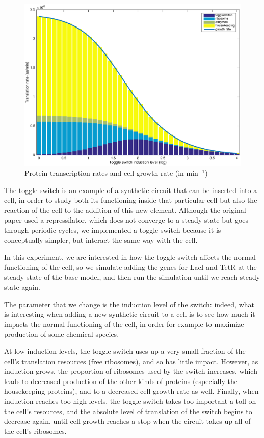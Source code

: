 \documentclass[a4paper]{article}
\begin{document}
\begin{figure}[h]
\includegraphics[width=\textwidth]{induction.eps}
\caption{Protein transcription rates and cell growth rate (in min$^{-1}$)}
\end{figure}

The toggle switch is an example of a synthetic circuit that can be inserted into a cell, in order to study both its functioning inside that particular cell but also the reaction of the cell to the addition of this new element.
Although the original paper used a repressilator, which does not converge to a steady state but goes through periodic cycles, we implemented a toggle switch because it is conceptually simpler, but interact the same way with the cell.

In this experiment, we are interested in how the toggle switch affects the normal functioning of the cell, so we simulate adding the genes for LacI and TetR at the steady state of the base model, and then run the simulation until we reach steady state again.

The parameter that we change is the induction level of the switch: indeed, what is interesting when adding a new synthetic circuit to a cell is to see how much it impacts the normal functioning of the cell, in order for example to maximize production of some chemical species.

At low induction levels, the toggle switch uses up a very small fraction of the cell's translation resources (free ribosomes), and so has little impact.
However, as induction grows, the proportion of ribosomes used by the switch increases, which leads to decreased production of the other kinds of proteins (especially the housekeeping proteins), and to a decreased cell growth rate as well.
Finally, when induction reaches too high levels, the toggle switch takes too important a toll on the cell's resources, and the absolute level of translation of the switch begins to decrease again, until cell growth reaches a stop when the circuit takes up all of the cell's ribosomes.
\end{document}
